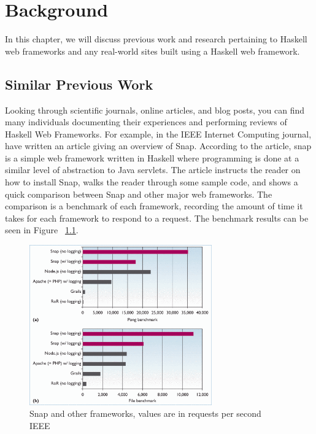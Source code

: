 \chapter{Background}
In this chapter, we will discuss previous work and research pertaining
to Haskell web frameworks and any real-world sites built using a Haskell
web framework.

\section{Similar Previous Work}

Looking through scientific journals, online articles, and blog posts,
you can find many individuals documenting their experiences and performing
reviews of Haskell Web Frameworks. For example, in the IEEE Internet Computing
journal, \citeauthor{snapFramework} have written an article giving an overview
of Snap. According to the article, snap is a simple web framework written
in Haskell where programming is done at a similar level of abstraction
to Java servlets. The article instructs the reader on how to install Snap, 
walks the reader through some sample code, and shows a quick comparison
between Snap and other major web frameworks. The comparison is a benchmark
of each framework, recording the amount of time it takes for each framework
to respond to a request. The benchmark results can be seen in Figure 
~\ref{fig:snapBenchmark}. \parencite{snapFramework}

\begin{figure}[H]
    \centering
    \includegraphics[width=0.7\textwidth]{final_report/pics/snapBenchmark.png}
    \caption{Snap and other frameworks, values are in requests per second \\ \textcopyright{} \citeyear{snapFramework} IEEE}
    \label{fig:snapBenchmark}
\end{figure}

